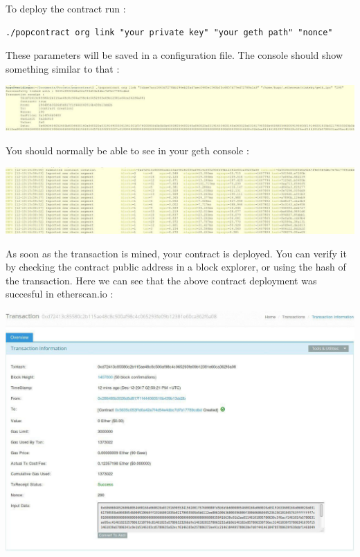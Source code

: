 \documentclass[11pt, a4paper, twoside, openright]{book} %
\begin{document}
To deploy the contract run : 
\begin{lstlisting}
./popcontract org link "your private key" "your geth path" "nonce"
\end{lstlisting}
These parameters will be saved in a configuration file.
The console should show something similar to that : 
\begin{center}
\includegraphics[scale=0.45]{orglink.jpg}
\end{center}
You should normally be able to see in your geth console : 
\begin{center}
\includegraphics[scale=0.45]{gethconsole.jpg}
\end{center}

As soon as the transaction is mined, your contract is deployed. You can verify it by checking the contract public address in a block explorer, or using the hash of the transaction. Here we can see that the above contract deployment was succesful in etherscan.io :
\begin{center}
\includegraphics[scale=0.5]{blockexplorer.jpg}
\end{center} 
\end{document}
